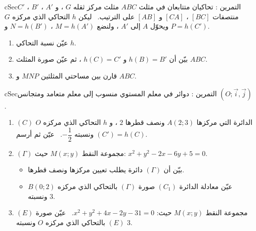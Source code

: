 \documentclass[12pt,a4paper]{article}
\newenvironment{BOX}[2]{\begin{otherlanguage}{english}\begin{arbox}{#1}{#2}}{\end{arbox}\end{otherlanguage}}
\newcounter{exo}
\newenvironment{tamrin}[1]{\stepcounter{exo}\begin{BOX}{cSec}{التمرين \theexo: #1}}{\end{BOX}}
\newenvironment{sq}{\begin{itemize}[leftmargin=2.4em,itemsep=3pt]}{\end{itemize}}
\newcommand{\qa}{\item[(أ)]}\newcommand{\qb}{\item[(ب)]}\newcommand{\qc}{\item[(جـ)]}\newcommand{\qd}{\item[(د)]}\newcommand{\qe}{\item[(هـ)]}
\begin{document}
\begin{tamrin}{تحاكيان متتابعان في مثلث}
$ABC$ مثلث مركز ثقله $G$ ، و $A'$ ، $B'$ ، $C'$ منتصفات $[BC]$ ، $[CA]$ و $[AB]$ على الترتيب. \ ليكن $h$ التحاكي الذي مركزه $G$ ويحوّل $A$ إلى $A'$ ، ولنضع $M=h(A')$ ، $N=h(B')$ و $P=h(C')$.
\begin{enumerate}
\item عيّن نسبة التحاكي $h$.
\item بيّن أن $h(B)=B'$ و $h(C)=C'$ ، ثم عيّن صورة المثلث $ABC$.
\item قارن بين مساحتي المثلثين $MNP$ و $ABC$.
\end{enumerate}
\end{tamrin}

\begin{tamrin}{دوائر في معلم}
المستوي منسوب إلى معلم متعامد ومتجانس $(O;\vec i,\vec j)$.
\begin{enumerate}
\item $(C)$ الدائرة التي مركزها $A(2;3)$ ونصف قطرها $2$ ، و $h$ التحاكي الذي مركزه $O$ ونسبته $-\dfrac12$. \ عيّن ثم أرسم $(C')=h(C)$.
\item $(\Gamma)$ مجموعة النقط $M(x;y)$ حيث: $x^2+y^2-2x-6y+5=0$.
\begin{sq}
\qa بيّن أن $(\Gamma)$ دائرة يطلب تعيين مركزها ونصف قطرها.
\qb عيّن معادلة الدائرة $(C_1)$ صورة $(\Gamma)$ بالتحاكي الذي مركزه $B(0;2)$ ونسبته $3$.
\end{sq}
\item $(E)$ مجموعة النقط $M(x;y)$ حيث: $x^2+y^2+4x-2y-31=0$. \ عيّن صورة $(E)$ بالتحاكي الذي مركزه $O$ ونسبته $3$.
\end{enumerate}
\end{tamrin}

\end{document}
